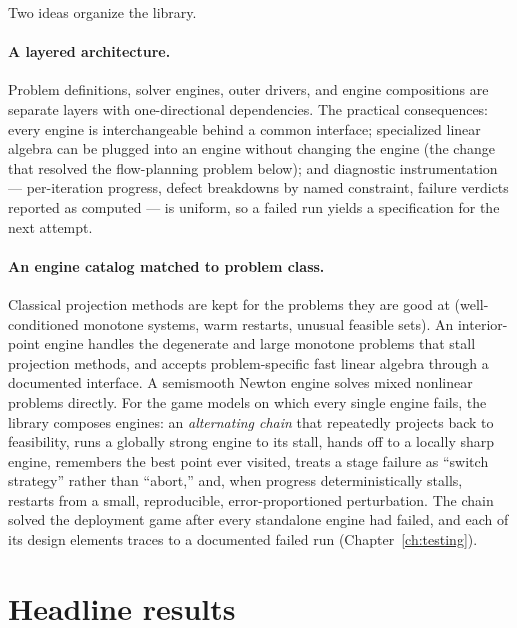 Two ideas organize the library.

\paragraph{A layered architecture.} Problem definitions, solver engines,
outer drivers, and engine compositions are separate layers with
one-directional dependencies. The practical consequences: every engine is
interchangeable behind a common interface; specialized linear algebra can
be plugged into an engine without changing the engine (the change that
resolved the flow-planning problem below); and diagnostic instrumentation
--- per-iteration progress, defect breakdowns by named constraint, failure
verdicts reported as computed --- is uniform, so a failed run yields a
specification for the next attempt.

\paragraph{An engine catalog matched to problem class.} Classical
projection methods are kept for the problems they are good at
(well-conditioned monotone systems, warm restarts, unusual feasible sets).
An interior-point engine handles the degenerate and large monotone
problems that stall projection methods, and accepts problem-specific fast
linear algebra through a documented interface. A semismooth Newton engine
solves mixed nonlinear problems directly. For the game models on which
every single engine fails, the library composes engines: an
\emph{alternating chain} that repeatedly projects back to feasibility,
runs a globally strong engine to its stall, hands off to a locally sharp
engine, remembers the best point ever visited, treats a stage failure as
``switch strategy'' rather than ``abort,'' and, when progress
deterministically stalls, restarts from a small, reproducible,
error-proportioned perturbation. The chain solved the deployment game
after every standalone engine had failed, and each of its design elements
traces to a documented failed run (Chapter~\ref{ch:testing}).

\section{Headline results}
\label{sec:o-results}

